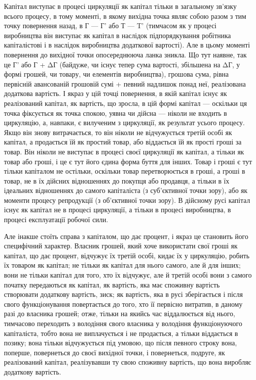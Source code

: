 Капітал виступає в процесі циркуляції як капітал тільки в
загальному зв’язку всього процесу, в тому моменті, в якому вихідна
точка являє собою разом з тим точку повернення назад, в Г — Г' або Т — T' (тимчасом як у процесі
виробництва він виступає як
капітал в наслідок підпорядкування робітника капіталістові і в
наслідок виробництва додаткової вартості). Але в цьому моменті
повернення до вихідної точки опосереднююча ланка зникла.
Що тут наявне, так це Г' або Г + ΔГ (байдуже, чи існує тепер
сума вартості, збільшена на ΔГ, у формі грошей, чи товару,
чи елементів виробництва), грошова сума, рівна первісній авансованій
грошовій сумі + певний надлишок понад неї, реалізована
додаткова вартість. І якраз у цій точці повернення, в якій
капітал існує як реалізований капітал, як вартість, що зросла,
в цій формі капітал — оскільки ця точка фіксується як точка
спокою, уявна чи дійсна — ніколи не входить в циркуляцію,
а, навпаки, є вилученим з циркуляції, як результат усього процесу.
Якщо він знову витрачається, то він ніколи не відчужується
третій особі як капітал, а продається їй як простий
товар, або віддається їй як прості гроші за товар. Він ніколи
не виступає в процесі своєї циркуляції як капітал, а тільки як
товар або гроші, і це є тут його єдина форма буття для інших.
Товар і гроші є тут тільки капіталом не остільки, оскільки
товар перетворюється в гроші, а гроші в товар, не в їх дійсних
відношеннях до покупця або продавця, а тільки в їх ідеальних
відношеннях до самого капіталіста (з суб’єктивної точки зору),
або як моменти процесу репродукції (з об’єктивної точки зору).
В дійсному русі капітал існує як капітал не в процесі циркуляції,
а тільки в процесі виробництва, в процесі експлуатації робочої
сили.

Але інакше стоїть справа з капіталом, що дає процент, і якраз
це становить його специфічний характер. Власник грошей,
який хоче використати свої гроші як капітал, що дає процент,
відчужує їх третій особі, кидає їх у циркуляцію, робить їх товаром
як капітал; не тільки як капітал для нього самого, але
й для інших; вони не тільки капітал для того, хто їх відчужує,
але й третій особі вони з самого початку передаються як
капітал, як вартість, яка має споживну вартість створювати
додаткову вартість, зиск; як вартість, яка в русі зберігається
і після свого функціонування повертається до того, хто її первісно
витратив, в даному разі до власника грошей; отже, тільки
на якийсь час віддалюється від нього, тимчасово переходить з
володіння свого власника у володіння функціонуючого капіталіста,
тобто вона не виплачується і не продається, а тільки віддається
в позику; вона тільки відчужується під умовою, що
після певного строку вона, поперше, повернеться до своєї вихідної
точки, і повернеться, подруге, як реалізований капітал,
реалізувавши ту свою споживну вартість, що вона виробляє додаткову
вартість.

